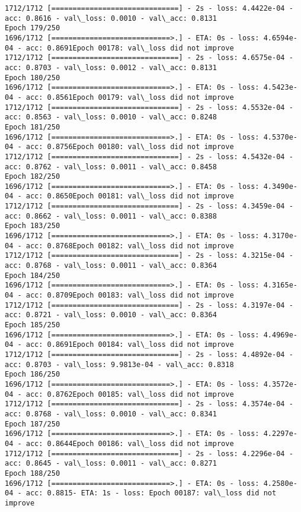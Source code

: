 \documentclass[11pt]{article}
\begin{document}
\begin{Verbatim}[commandchars=\\\{\}]
1712/1712 [==============================] - 2s - loss: 4.4422e-04 - acc: 0.8616 - val\_loss: 0.0010 - val\_acc: 0.8131
Epoch 179/250
1696/1712 [============================>.] - ETA: 0s - loss: 4.6594e-04 - acc: 0.8691Epoch 00178: val\_loss did not improve
1712/1712 [==============================] - 2s - loss: 4.6575e-04 - acc: 0.8703 - val\_loss: 0.0012 - val\_acc: 0.8131
Epoch 180/250
1696/1712 [============================>.] - ETA: 0s - loss: 4.5423e-04 - acc: 0.8561Epoch 00179: val\_loss did not improve
1712/1712 [==============================] - 2s - loss: 4.5532e-04 - acc: 0.8563 - val\_loss: 0.0010 - val\_acc: 0.8248
Epoch 181/250
1696/1712 [============================>.] - ETA: 0s - loss: 4.5370e-04 - acc: 0.8756Epoch 00180: val\_loss did not improve
1712/1712 [==============================] - 2s - loss: 4.5432e-04 - acc: 0.8762 - val\_loss: 0.0011 - val\_acc: 0.8458
Epoch 182/250
1696/1712 [============================>.] - ETA: 0s - loss: 4.3490e-04 - acc: 0.8650Epoch 00181: val\_loss did not improve
1712/1712 [==============================] - 2s - loss: 4.3459e-04 - acc: 0.8662 - val\_loss: 0.0011 - val\_acc: 0.8388
Epoch 183/250
1696/1712 [============================>.] - ETA: 0s - loss: 4.3170e-04 - acc: 0.8768Epoch 00182: val\_loss did not improve
1712/1712 [==============================] - 2s - loss: 4.3215e-04 - acc: 0.8768 - val\_loss: 0.0011 - val\_acc: 0.8364
Epoch 184/250
1696/1712 [============================>.] - ETA: 0s - loss: 4.3165e-04 - acc: 0.8709Epoch 00183: val\_loss did not improve
1712/1712 [==============================] - 2s - loss: 4.3197e-04 - acc: 0.8721 - val\_loss: 0.0010 - val\_acc: 0.8364
Epoch 185/250
1696/1712 [============================>.] - ETA: 0s - loss: 4.4969e-04 - acc: 0.8691Epoch 00184: val\_loss did not improve
1712/1712 [==============================] - 2s - loss: 4.4892e-04 - acc: 0.8703 - val\_loss: 9.9813e-04 - val\_acc: 0.8318
Epoch 186/250
1696/1712 [============================>.] - ETA: 0s - loss: 4.3572e-04 - acc: 0.8762Epoch 00185: val\_loss did not improve
1712/1712 [==============================] - 2s - loss: 4.3574e-04 - acc: 0.8768 - val\_loss: 0.0010 - val\_acc: 0.8341
Epoch 187/250
1696/1712 [============================>.] - ETA: 0s - loss: 4.2297e-04 - acc: 0.8644Epoch 00186: val\_loss did not improve
1712/1712 [==============================] - 2s - loss: 4.2296e-04 - acc: 0.8645 - val\_loss: 0.0011 - val\_acc: 0.8271
Epoch 188/250
1696/1712 [============================>.] - ETA: 0s - loss: 4.2580e-04 - acc: 0.8815- ETA: 1s - loss: Epoch 00187: val\_loss did not improve

\end{Verbatim}
\end{document}

